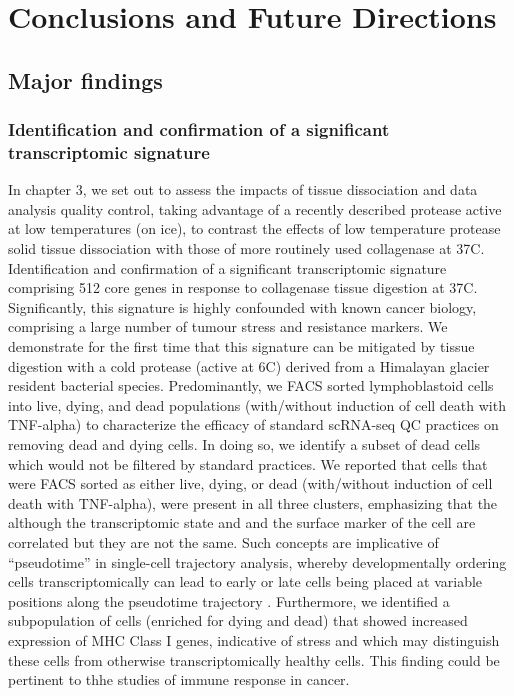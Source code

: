
{\chapter{Conclusions and Future Directions}

}
\label{ch:Chapter6}

\section{Major findings}


\subsection{Identification and confirmation of a significant transcriptomic signature}

In chapter 3, we set out to assess the impacts of tissue dissociation and data analysis quality control, taking advantage of a recently described protease active at low temperatures (on ice), to contrast the effects of low temperature protease solid tissue dissociation with those of more routinely used collagenase at 37\textdegree C. Identification and confirmation of a significant transcriptomic signature comprising 512 core genes in response to collagenase tissue digestion at 37\textdegree C. Significantly, this signature is highly confounded with known cancer biology, comprising a large number of tumour stress and resistance markers. We demonstrate for the first time that this signature can be mitigated by tissue digestion with a cold protease (active at 6\textdegree C) derived from a Himalayan glacier resident bacterial species.
Predominantly, we FACS sorted lymphoblastoid cells into live, dying, and dead populations (with/without induction of cell death with TNF-alpha) to characterize the efficacy of standard scRNA-seq QC practices on removing dead and dying cells. In doing so, we identify a subset of dead cells which would not be filtered by standard practices. We reported that cells that were FACS sorted as either live, dying, or dead (with/without induction of cell death with TNF-alpha), were present in all three clusters, emphasizing that the although the transcriptomic state and and the surface marker of the cell are correlated but they are not the same. Such concepts are implicative  of ``pseudotime'' in single-cell trajectory analysis, whereby developmentally ordering cells transcriptomically can lead to early or late cells being placed at variable positions along the pseudotime trajectory \cite{campbell2018descriptive, campbell2018uncovering}. 
 Furthermore, we identified a subpopulation of cells (enriched for dying and dead) that showed increased expression of MHC Class I genes, indicative of stress and which may distinguish these cells from otherwise transcriptomically healthy cells. This finding could be pertinent to thhe studies of immune response in cancer.
 
